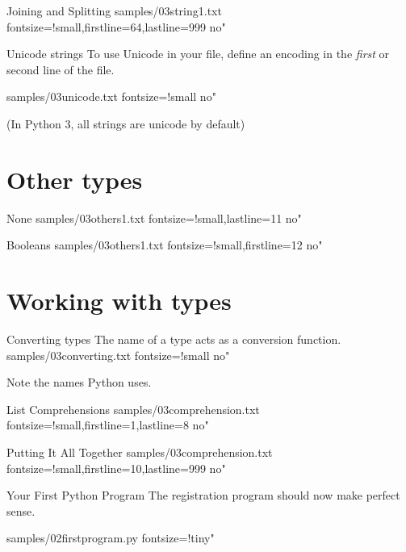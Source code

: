 \documentclass[reference]{pyslides}
\begin{document}
\begin{frame}[fragile]{Joining and Splitting}
 samples/03string1.txt fontsize=!small,firstline=64,lastline=999 no"
\end{frame}

\begin{frame}[fragile]{Unicode strings}
To use Unicode in your file, define an encoding in the \emph{first} or second line of the file.

\bigskip

 samples/03unicode.txt fontsize=!small no"

\bigskip

{\small (In Python 3, all strings are unicode by default)}
\end{frame}

\section{Other types}

\begin{frame}[fragile]{None}
 samples/03others1.txt fontsize=!small,lastline=11 no"
\end{frame}

\begin{frame}[fragile]{Booleans}
 samples/03others1.txt fontsize=!small,firstline=12 no"
\end{frame}

\section{Working with types}

\begin{frame}[fragile]{Converting types}
The name of a type acts as a conversion function.
 samples/03converting.txt fontsize=!small no"

\bigskip

Note the names Python uses.
\end{frame}

\begin{frame}[fragile]{List Comprehensions}
 samples/03comprehension.txt fontsize=!small,firstline=1,lastline=8 no"
\end{frame}

\begin{frame}[fragile]{Putting It All Together}
 samples/03comprehension.txt fontsize=!small,firstline=10,lastline=999 no"
\end{frame}

\begin{frame}[fragile]{Your First Python Program}
The registration program should now make perfect sense.

\bigskip

 samples/02firstprogram.py fontsize=!tiny"

\bigskip
\end{frame}
\end{document}

